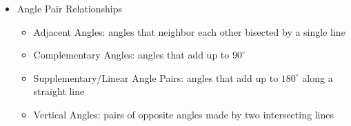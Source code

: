 \documentclass[11pt,letterpaper]{article}
\begin{document}
\begin{minipage}{\textwidth}
     \begin{itemize}
          \item Angle Pair Relationships
          \begin{itemize}
               \item Adjacent Angles: angles that neighbor each other bisected by a single line
               \item Complementary Angles: angles that add up to $90^{\circ}$
               \item Supplementary/Linear Angle Pairs: angles that add up to $180^{\circ}$ along a straight line
               \item Vertical Angles: pairs of opposite angles made by two intersecting lines
               

\end{itemize}
\end{itemize}
\end{minipage}
\end{document}

